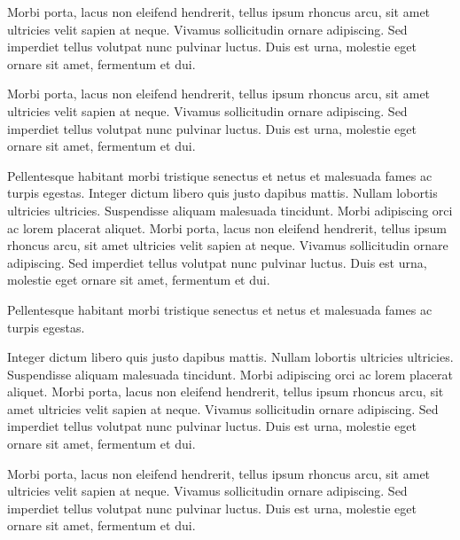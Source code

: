 Morbi porta, lacus non eleifend hendrerit, tellus ipsum rhoncus arcu, sit amet ultricies velit sapien at neque. Vivamus sollicitudin ornare adipiscing. Sed imperdiet tellus volutpat nunc pulvinar luctus. Duis est urna, molestie eget ornare sit amet, fermentum et dui. 


Morbi porta, lacus non eleifend hendrerit, tellus ipsum rhoncus arcu, sit amet ultricies velit sapien at neque. Vivamus sollicitudin ornare adipiscing. Sed imperdiet tellus volutpat nunc pulvinar luctus. Duis est urna, molestie eget ornare sit amet, fermentum et dui. 

Pellentesque habitant morbi tristique senectus et netus et malesuada fames ac turpis egestas. Integer dictum libero quis justo dapibus mattis. Nullam lobortis ultricies ultricies. Suspendisse aliquam malesuada tincidunt. Morbi adipiscing orci ac lorem placerat aliquet. Morbi porta, lacus non eleifend hendrerit, tellus ipsum rhoncus arcu, sit amet ultricies velit sapien at neque. Vivamus sollicitudin ornare adipiscing. Sed imperdiet tellus volutpat nunc pulvinar luctus. Duis est urna, molestie eget ornare sit amet, fermentum et dui. 


Pellentesque habitant morbi tristique senectus et netus et malesuada fames ac turpis egestas. 


Integer dictum libero quis justo dapibus mattis. Nullam lobortis ultricies ultricies. Suspendisse aliquam malesuada tincidunt. Morbi adipiscing orci ac lorem placerat aliquet. Morbi porta, lacus non eleifend hendrerit, tellus ipsum rhoncus arcu, sit amet ultricies velit sapien at neque. Vivamus sollicitudin ornare adipiscing. Sed imperdiet tellus volutpat nunc pulvinar luctus. Duis est urna, molestie eget ornare sit amet, fermentum et dui. 


Morbi porta, lacus non eleifend hendrerit, tellus ipsum rhoncus arcu, sit amet ultricies velit sapien at neque. Vivamus sollicitudin ornare adipiscing. Sed imperdiet tellus volutpat nunc pulvinar luctus. Duis est urna, molestie eget ornare sit amet, fermentum et dui. 


